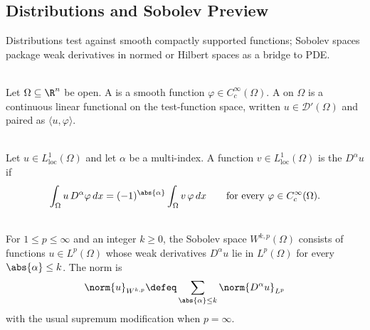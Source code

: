 \subsection{Distributions and Sobolev Preview}

%

Distributions test against smooth compactly supported functions; Sobolev spaces package weak derivatives in normed or Hilbert spaces as a bridge to PDE.

\begin{definition} \label{def:test-functions-and-distributions} \\
Let $\Omega\subseteq\R^n$ be open. A  is a smooth function $\varphi\in C_c^\infty(\Omega)$. A  on $\Omega$ is a continuous linear functional on the test-function space, written $u\in\mathcal{D}'(\Omega)$ and paired as $\langle u,\varphi\rangle$.
\end{definition}

\begin{definition} \label{def:weak-derivative} \\
Let $u\in L_{\mathrm{loc}}^1(\Omega)$ and let $\alpha$ be a multi-index. A function $v\in L_{\mathrm{loc}}^1(\Omega)$ is the  $D^\alpha u$ if
\[
\int_{\Omega}u\,D^\alpha\varphi\,dx
=(-1)^{\abs{\alpha}}\int_{\Omega}v\,\varphi\,dx
\qquad\text{for every }\varphi\in C_c^\infty(\Omega).
\]
\end{definition}

\begin{definition} \label{def:sobolev-space-preview} \\
For $1\leq p\leq\infty$ and an integer $k\geq0$, the Sobolev space $W^{k,p}(\Omega)$ consists of functions $u\in L^p(\Omega)$ whose weak derivatives $D^\alpha u$ lie in $L^p(\Omega)$ for every $\abs{\alpha}\leq k$. The norm is
\[
\norm{u}_{W^{k,p}}\defeq
\sum_{\abs{\alpha}\leq k}\norm{D^\alpha u}_{L^p}
\]
with the usual supremum modification when $p=\infty$.
\end{definition}
